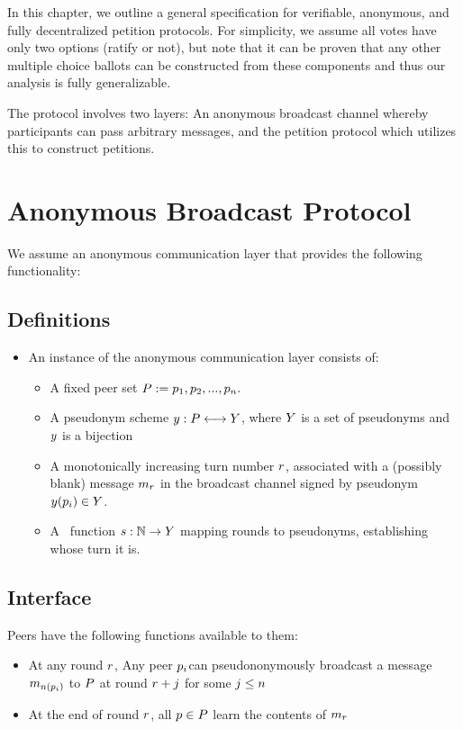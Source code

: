 In this chapter, we outline a general specification for verifiable, anonymous,
and fully decentralized petition protocols. For simplicity, we assume all votes
have only two options (ratify or not), but note that it can be proven that any
other multiple choice ballots can be constructed from these components and thus
our analysis is fully generalizable.

The protocol involves two layers: An anonymous broadcast channel whereby
participants can pass arbitrary messages, and the petition protocol which
utilizes this to construct petitions.
\section{Anonymous Broadcast Protocol}
We assume an anonymous communication layer that provides the following
functionality:

\subsection{Definitions}
\begin{itemize}
\item An instance of the anonymous communication layer consists of:

\begin{itemize}
\item A fixed peer set
  $P:=p_{1},p_{2},...,p_{n}.$
\item A pseudonym scheme $y:P\longleftrightarrow Y$,
  where $Y$ is a set of pseudonyms and $y$ is a bijection
\item A monotonically increasing turn number $r$, associated with a
  (possibly blank) message $m_{r}$ in the broadcast channel signed by
  pseudonym $y(p_{i})\in Y$.
\item A \KwSchedule~function $s:\mathbb{N}\to Y$ mapping
  rounds to pseudonyms, establishing whose turn it is.
\end{itemize}
\end{itemize}

\subsection{Interface}

Peers have the following functions available to them:
\begin{itemize}
\item At any round $r$, Any peer $p_{i}$can pseudononymously broadcast
a message $m_{n(p_{i})}$ to $P$ at round $r+j$
for some $j\le n$
\item At the end of round $r$, all $p\in P$ learn the contents
  of $m_{r}$
\end{itemize}

